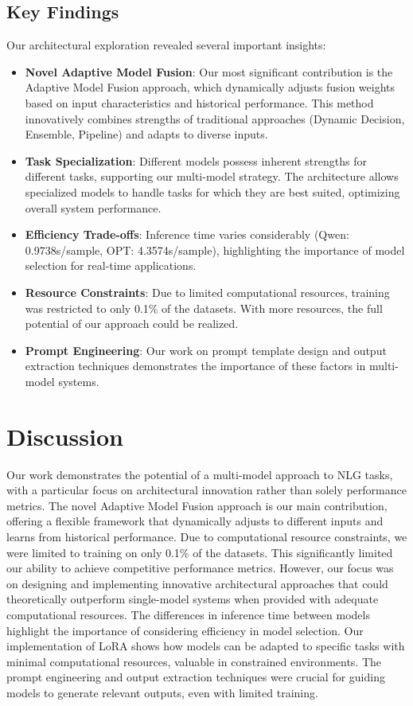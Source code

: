 \documentclass[10pt,twocolumn,letterpaper]{article}
\begin{document}
\subsection{Key Findings}
Our architectural exploration revealed several important insights:
\begin{itemize}
    \item \textbf{Novel Adaptive Model Fusion}: Our most significant contribution is the Adaptive Model Fusion approach, which dynamically adjusts fusion weights based on input characteristics and historical performance. This method innovatively combines strengths of traditional approaches (Dynamic Decision, Ensemble, Pipeline) and adapts to diverse inputs.
    \item \textbf{Task Specialization}: Different models possess inherent strengths for different tasks, supporting our multi-model strategy. The architecture allows specialized models to handle tasks for which they are best suited, optimizing overall system performance.
    \item \textbf{Efficiency Trade-offs}: Inference time varies considerably (Qwen: 0.9738s/sample, OPT: 4.3574s/sample), highlighting the importance of model selection for real-time applications.
    \item \textbf{Resource Constraints}: Due to limited computational resources, training was restricted to only 0.1\% of the datasets. With more resources, the full potential of our approach could be realized.
    \item \textbf{Prompt Engineering}: Our work on prompt template design and output extraction techniques demonstrates the importance of these factors in multi-model systems.
\end{itemize}

\section{Discussion}
Our work demonstrates the potential of a multi-model approach to NLG tasks, with a particular focus on architectural innovation rather than solely performance metrics. The novel Adaptive Model Fusion approach is our main contribution, offering a flexible framework that dynamically adjusts to different inputs and learns from historical performance. Due to computational resource constraints, we were limited to training on only 0.1\% of the datasets. This significantly limited our ability to achieve competitive performance metrics. However, our focus was on designing and implementing innovative architectural approaches that could theoretically outperform single-model systems when provided with adequate computational resources. The differences in inference time between models highlight the importance of considering efficiency in model selection. Our implementation of LoRA shows how models can be adapted to specific tasks with minimal computational resources, valuable in constrained environments. The prompt engineering and output extraction techniques were crucial for guiding models to generate relevant outputs, even with limited training.
\end{document}
